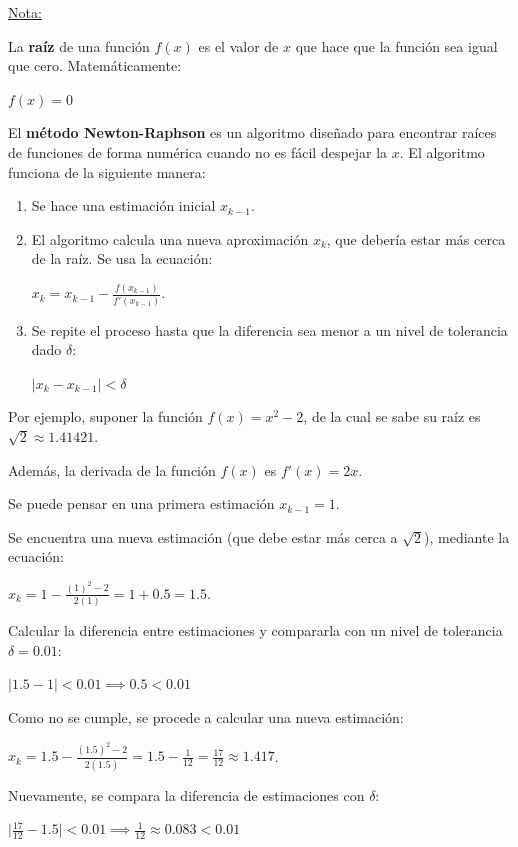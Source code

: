 \documentclass{article}
\newenvironment{nota_computacional}
  {\begin{mdframed}[backgroundcolor=gray!10, linecolor=gray!40, roundcorner=5pt, skipabove=10pt, skipbelow=10pt]}
  {\end{mdframed}}
\begin{document}
\begin{nota_computacional}
\underline{Nota:}

La \textbf{raíz} de una función $f(x)$ es el valor de $x$ que hace que la función sea igual que cero. Matemáticamente:

$f(x) = 0$

El \textbf{método Newton-Raphson} es un algoritmo diseñado para encontrar raíces de funciones de forma numérica cuando no es fácil despejar la $x$. El algoritmo funciona de la siguiente manera:

\begin{enumerate}
    \item Se hace una estimación inicial $x_{k - 1}$.
    \item El algoritmo calcula una nueva aproximación $x_k$, que debería estar más cerca de la raíz. Se usa la ecuación:
    
    $\displaystyle x_k = x_{k - 1} - \frac{f(x_{k - 1})}{f'(x_{k - 1})}$.

    \item Se repite el proceso hasta que la diferencia sea menor a un nivel de tolerancia dado $\delta$:
    
    $\mid x_k - x_{k - 1} \mid < \delta$

\end{enumerate}

Por ejemplo, suponer la función $f(x) = x^2 - 2$, de la cual se sabe su raíz es $\sqrt{2} \approx 1.41421$.

Además, la derivada de la función $f(x)$ es $f'(x) = 2x$.

Se puede pensar en una primera estimación $x_{k - 1} = 1$.

Se encuentra una nueva estimación (que debe estar más cerca a $\sqrt{2}$), mediante la ecuación:

$\displaystyle x_k = 1 - \frac{(1)^2 - 2}{2(1)} = 1 + 0.5 = 1.5$.

Calcular la diferencia entre estimaciones y compararla con un nivel de tolerancia $\delta = 0.01$:

$\mid 1.5 - 1 \mid < 0.01 \implies 0.5 < 0.01$

Como no se cumple, se procede a calcular una nueva estimación:

$\displaystyle x_k = 1.5 - \frac{(1.5)^2 - 2}{2(1.5)} = 1.5 - \frac{1}{12} = \frac{17}{12} \approx 1.417$.

Nuevamente, se compara la diferencia de estimaciones con $\delta$:

$\mid \frac{17}{12} - 1.5 \mid < 0.01 \implies \frac{1}{12} \approx 0.083 < 0.01$


\end{nota_computacional}
\end{document}
